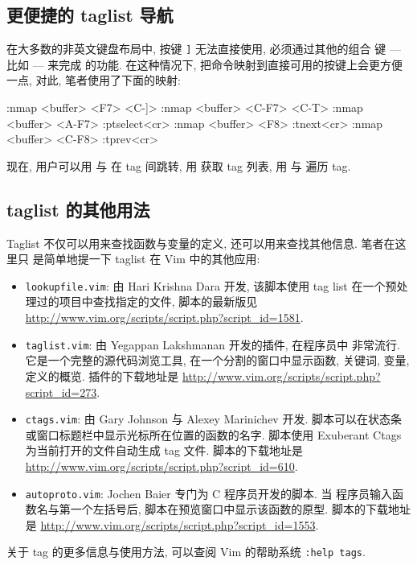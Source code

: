 \subsection{更便捷的 taglist 导航}
\label{subsec:easier_taglist_navigation}

在大多数的非英文键盘布局中, 按键 \texttt{]} 无法直接使用, 必须通过其他的组合
键 --- 比如  --- 来完成 \key{Ctrl+]} 的功能. 在这种情况下,
把命令映射到直接可用的按键上会更方便一点, 对此, 笔者使用了下面的映射:
\begin{vimcode}
:nmap <buffer> <F7> <C-]>
:nmap <buffer> <C-F7> <C-T>
:nmap <buffer> <A-F7> :ptselect<cr>
:nmap <buffer> <F8> :tnext<cr>
:nmap <buffer> <C-F8> :tprev<cr>
\end{vimcode}
现在, 用户可以用  与  在 tag 间跳转, 用 
获取 tag 列表, 用  与  遍历 tag.

\subsection{taglist 的其他用法}
\label{subsec:other_usages_of_taglists}

Taglist 不仅可以用来查找函数与变量的定义, 还可以用来查找其他信息. 笔者在这里只
是简单地提一下 taglist 在 Vim 中的其他应用:
\begin{itemize}
    \item \texttt{lookupfile.vim}: 由 Hari Krishna Dara 开发, 该脚本使用 tag
        list 在一个预处理过的项目中查找指定的文件, 脚本的最新版见
        \url{http://www.vim.org/scripts/script.php?script_id=1581}.
    \item \texttt{taglist.vim}: 由 Yegappan Lakshmanan 开发的插件, 在程序员中
        非常流行. 它是一个完整的源代码浏览工具, 在一个分割的窗口中显示函数,
        关键词, 变量, 定义的概览. 插件的下载地址是
        \url{http://www.vim.org/scripts/script.php?script_id=273}.
    \item \texttt{ctags.vim}: 由 Gary Johnson 与 Alexey Marinichev 开发.
        脚本可以在状态条或窗口标题栏中显示光标所在位置的函数的名字. 脚本使用
        Exuberant Ctags 为当前打开的文件自动生成 tag 文件. 脚本的下载地址是
        \url{http://www.vim.org/scripts/script.php?script_id=610}.
    \item \texttt{autoproto.vim}: Jochen Baier 专门为 C 程序员开发的脚本. 当
        程序员输入函数名与第一个左括号后, 脚本在预览窗口中显示该函数的原型.
        脚本的下载地址是
        \url{http://www.vim.org/scripts/script.php?script_id=1553}.
\end{itemize}
\begin{warning}
    关于 tag 的更多信息与使用方法, 可以查阅 Vim 的帮助系统 \texttt{:help tags}.
\end{warning}

